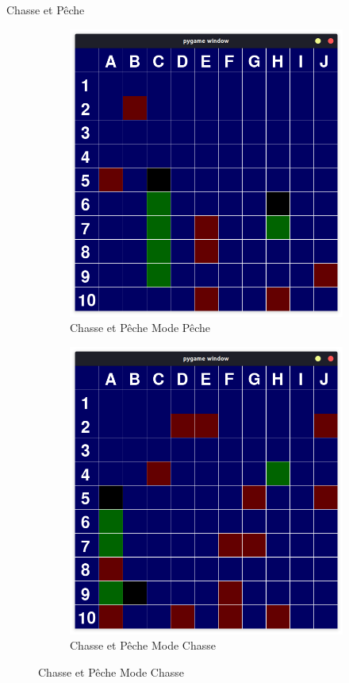 	\begin{frame}{Chasse et Pêche}
	    \begin{figure}
		    \begin{subfigure}{.48\textwidth}
    		    \centering
    		    \includegraphics[width=.9\linewidth]{images/peche.png}
                \caption*{Chasse et Pêche Mode Pêche}
                \label{fig:CPpeche}
            \end{subfigure}
            \begin{subfigure}{.48\textwidth}
                \centering
                \includegraphics[width=.9\linewidth]{images/chasse.png}
                 \caption*{Chasse et Pêche Mode Chasse}
                \label{fig:CPchasse}
            \end{subfigure}
        \end{figure}
	\end{frame}{}
	
